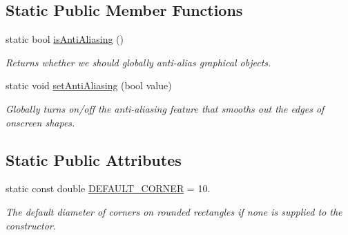 \subsection*{Static Public Member Functions}
\begin{DoxyCompactItemize}
\item 
static bool \mbox{\hyperlink{classsgl_1_1GObject_a93be0e1fe1b1bf1a1da732470c94f42b}{is\+Anti\+Aliasing}} ()
\begin{DoxyCompactList}\small\item\em Returns whether we should globally anti-\/alias graphical objects. \end{DoxyCompactList}\item 
static void \mbox{\hyperlink{classsgl_1_1GObject_a1e43371668ae850193cebedb44e1bbe3}{set\+Anti\+Aliasing}} (bool value)
\begin{DoxyCompactList}\small\item\em Globally turns on/off the anti-\/aliasing feature that smooths out the edges of onscreen shapes. \end{DoxyCompactList}\end{DoxyCompactItemize}
\subsection*{Static Public Attributes}
\begin{DoxyCompactItemize}
\item 
static const double \mbox{\hyperlink{classsgl_1_1GRoundRect_a6e0fd235a5cfe88a0b0825202575bed9}{D\+E\+F\+A\+U\+L\+T\+\_\+\+C\+O\+R\+N\+ER}} = 10.
\begin{DoxyCompactList}\small\item\em The default diameter of corners on rounded rectangles if none is supplied to the constructor. \end{DoxyCompactList}\end{DoxyCompactItemize}
